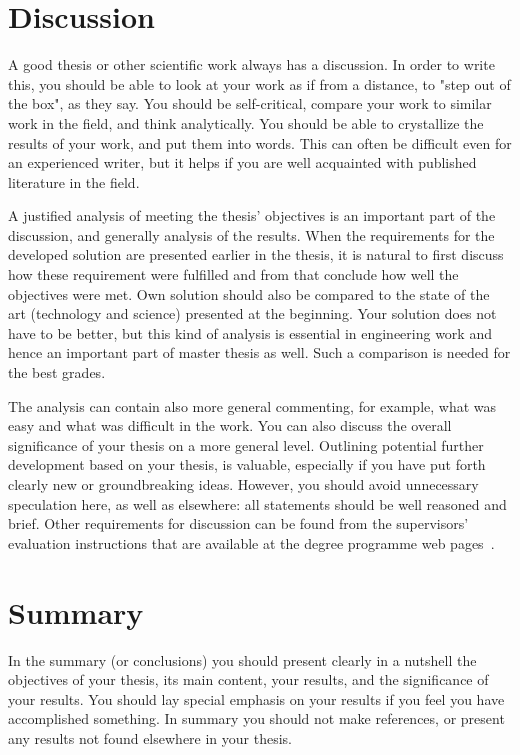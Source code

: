 \section{Discussion}

A good thesis or other scientific work always has a discussion. In order to write this, you should be able to look at your work as if from a distance, to "step out of the box", as they say. You should be self-critical, compare your work to similar work in the field, and think analytically. You should be able to crystallize the results of your work, and put them into words. This can often be difficult even for an experienced writer, but it helps if you are well acquainted with published literature in the field.

A justified analysis of meeting the thesis’ objectives is an important part of the discussion, and generally analysis of the results. When the requirements for the developed solution are presented earlier in the thesis, it is natural to first discuss how these requirement were fulfilled and from that conclude how well the objectives were met. Own solution should also be compared to the state of the art (technology and science) presented at the beginning. Your solution does not have to be better, but this kind of analysis is essential in engineering work and hence an important part of master thesis as well. Such a comparison is needed for the best grades.

The analysis can contain also more general commenting, for example, what was easy and what was difficult in the work. You can also discuss the overall significance of your thesis on a more general level. Outlining potential further development based on your thesis, is valuable, especially if you have put forth clearly new or groundbreaking ideas. However, you should avoid unnecessary speculation here, as well as elsewhere: all statements should be well reasoned and brief. Other requirements for discussion can be found from the supervisors’ evaluation instructions that are available at the degree programme web pages~\cite{mscstudies}.

\section{Summary}

In the summary (or conclusions) you should present clearly in a nutshell the objectives of your thesis, its main content, your results, and the significance of your results. You should lay special emphasis on your results if you feel you have accomplished something. In summary you should not make references, or present any results not found elsewhere in your thesis.

